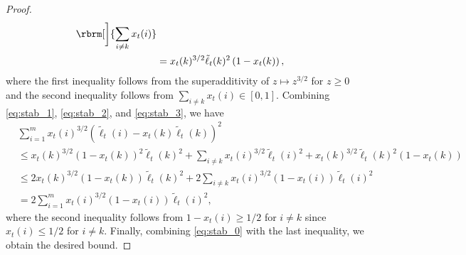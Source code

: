\begin{proof}
\begin{align}
    \rbrm[\bigg]{
        \sum_{i \neq k}
        x_t(i)
    }
    \nonumber \\
    &
    =
    x_t(k)^{3/2} \tilde{\ell}_t(k)^2
    \left(
        1 - x_t(k)
    \right)
    ,
    \label{eq:stab_3}
\end{align}
where the first inequality follows from the superadditivity of $z \mapsto z^{3/2}$ for $z \geq 0$
and the second inequality follows from $\sum_{i \neq k} x_t(i) \in [0,1]$.
Combining \eqref{eq:stab_1}, \eqref{eq:stab_2}, and \eqref{eq:stab_3},
we have
\begin{align}
    &
    \sum_{i=1}^m 
    x_t(i)^{3/2} \left( 
        \tilde{\ell}_t(i) - x_t(k) \tilde{\ell}_t(k)
    \right)^2    
    \nonumber \\
    &\leq
    x_t(k)^{3/2}
    \left( 
        1 - x_t(k)
    \right)^2
    \tilde{\ell}_t(k)^2
    +
    \sum_{i \neq k}
    x_t(i)^{3/2}
    \tilde{\ell}_t(i)^2
    +
    x_t(k)^{3/2}
    \tilde{\ell}_t(k)^2
    (1 - x_t(k))
    \nonumber \\
    &\leq
    2
    x_t(k)^{3/2}
    \left( 
        1 - x_t(k)
    \right)
    \tilde{\ell}_t(k)^2
    +
    2
    \sum_{i \neq k}
    x_t(i)^{3/2} (1 - x_t(i))
    \tilde{\ell}_t(i)^2
    \nonumber \\
    &=
    2
    \sum_{i=1}^m
    x_t(i)^{3/2} (1 - x_t(i))
    \tilde{\ell}_t(i)^2
    ,
    \nonumber
\end{align}
where the second inequality follows from $1 - x_t(i) \geq 1/2$ for $i \neq k$ since $x_t(i) \leq 1/2$ for $i \neq k$.
Finally, combining \eqref{eq:stab_0} with the last inequality, we obtain the desired bound.
\end{proof}

